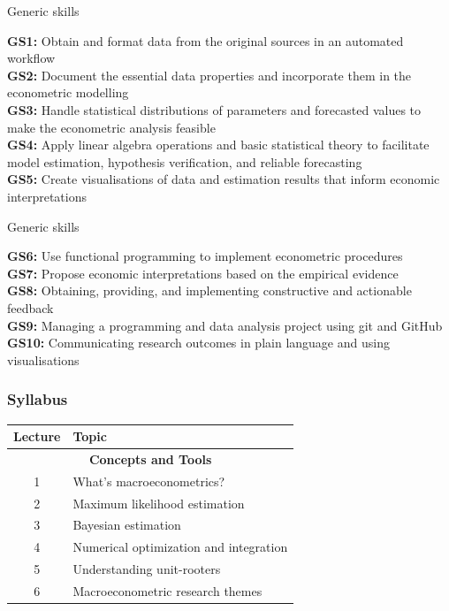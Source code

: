 \documentclass[notes,blackandwhite,mathsans]{beamer}
\begin{document}
\begin{frame}{Generic skills}

\textbf{GS1:} Obtain and format data from the original sources in an automated workflow\\[1ex]
\textbf{GS2:} Document the essential data properties and incorporate them in the econometric modelling\\[1ex]
\textbf{GS3:} Handle statistical distributions of parameters and forecasted values to make the econometric analysis feasible\\[1ex]
\textbf{GS4:} Apply linear algebra operations and basic statistical theory to facilitate model estimation, hypothesis verification, and reliable forecasting\\[1ex]
\textbf{GS5:} Create visualisations of data and estimation results that inform economic interpretations \\[1ex]

\end{frame}



\begin{frame}{Generic skills}

\textbf{GS6:} Use functional programming to implement econometric procedures\\[1ex]
\textbf{GS7:} Propose economic interpretations based on the empirical evidence\\[1ex]
\textbf{GS8:} Obtaining, providing, and implementing constructive and actionable feedback\\[1ex]
\textbf{GS9:} Managing a programming and data analysis project using git and GitHub\\[1ex]
\textbf{GS10:} Communicating research outcomes in plain language and using visualisations

\end{frame}







\begin{frame}
\frametitle{Syllabus}

\begin{center}
\begin{tabular}{ c l}
\toprule 
Lecture & Topic \\
\midrule
\multicolumn{2}{c}{\textbf{Concepts and Tools}}\\
1  & {\color{mcxs2}What's macroeconometrics?} \\
2  & {\color{mcxs2}Maximum likelihood estimation}  \\
3  & {\color{mcxs1}Bayesian estimation} \\
4  & {\color{mcxs2}Numerical optimization and integration} \\
5  & {\color{mcxs2}Understanding unit-rooters} \\
6  & {\color{mcxs1}Macroeconometric research themes} \\[1ex]\bottomrule
\end{tabular}
\end{center}
\end{frame}
\end{document}
